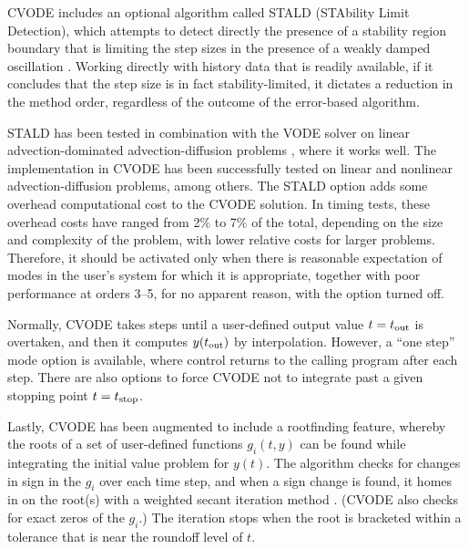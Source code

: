 CVODE includes an optional algorithm called STALD (STAbility Limit
Detection), which attempts to detect directly the presence of a
stability region boundary that is limiting the step sizes in the
presence of a weakly damped oscillation \cite{Hin:92}.  Working
directly with history data that is readily available, if it concludes
that the step size is in fact stability-limited, it dictates a
reduction in the method order, regardless of the outcome of the
error-based algorithm.

STALD has been tested in combination with the VODE solver on linear
advection-dominated advection-diffusion problems \cite{Hin:95}, where
it works well.  The implementation in CVODE has been successfully
tested on linear and nonlinear advection-diffusion problems, among others.
The STALD option adds some overhead computational cost to the CVODE
solution.  In timing tests, these overhead costs have ranged from 2\%
to 7\% of the total, depending on the size and complexity of the
problem, with lower relative costs for larger problems.  Therefore, it
should be activated only when there is reasonable expectation of modes
in the user's system for which it is appropriate, together with poor
performance at orders 3--5, for no apparent reason, with the option
turned off.

Normally, CVODE takes steps until a user-defined output value
$t = t_{\mbox{\scriptsize out}}$ is overtaken, and then it computes
$y(t_{\mbox{\scriptsize out}})$ by interpolation.  However, a
``one step'' mode option is available, where control returns to the
calling program after each step.  There are also options to force
CVODE not to integrate past a given stopping point
$t = t_{\mbox{\scriptsize stop}}$.

Lastly, CVODE has been augmented to include a rootfinding feature,
whereby the roots of a set of user-defined functions $g_i(t,y)$
can be found while integrating the initial value problem for
$y(t)$.  The algorithm checks for changes in sign in the
$g_i$ over each time step, and when a sign change is found, it
homes in on the root(s) with a weighted secant iteration method
\cite{HeSh:80}. (CVODE also checks for exact zeros of the $g_i$.)
The iteration stops when the root is bracketed within a tolerance
that is near the roundoff level of $t$.
